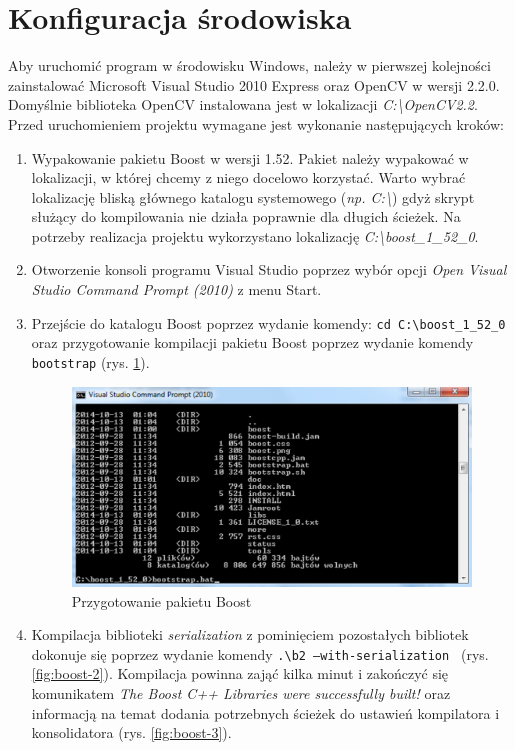 \section{Konfiguracja środowiska}
Aby uruchomić program w środowisku Windows, należy w pierwszej kolejności zainstalować Microsoft Visual Studio 2010 Express oraz OpenCV w wersji 2.2.0. Domyślnie biblioteka OpenCV instalowana jest w lokalizacji \emph{C:\textbackslash OpenCV2.2}. Przed uruchomieniem projektu wymagane jest wykonanie następujących kroków:
\begin{enumerate}
  \item Wypakowanie pakietu Boost w wersji 1.52. Pakiet należy wypakować w lokalizacji, w której chcemy z niego docelowo korzystać. Warto wybrać lokalizację bliską głównego katalogu systemowego (\emph{np. C:\textbackslash}) gdyż skrypt służący do kompilowania nie działa poprawnie dla długich ścieżek. Na potrzeby realizacja projektu wykorzystano lokalizację \emph{C:\textbackslash boost\_1\_52\_0}.
  \item Otworzenie konsoli programu Visual Studio poprzez wybór opcji \emph{Open Visual Studio Command Prompt (2010)} z menu Start.
  \item Przejście do katalogu Boost poprzez wydanie komendy: \texttt{cd C:\textbackslash boost\_1\_52\_0} oraz przygotowanie kompilacji pakietu Boost poprzez wydanie komendy \texttt{bootstrap} (rys. \ref{fig:boost-1}).
  
  \begin{figure}[h]
		\centering
		\includegraphics[scale=0.85]{graphics/03_implementacja/boost-1.pdf}
		\caption{ Przygotowanie pakietu Boost }
		\label{fig:boost-1}
	\end{figure}

  \item Kompilacja biblioteki \emph{serialization} z pominięciem pozostałych bibliotek dokonuje się poprzez wydanie komendy \texttt{.\textbackslash b2 --with-serialization } (rys. \ref{fig:boost-2}). Kompilacja powinna zająć kilka minut i zakończyć się komunikatem \emph{The Boost C++ Libraries were successfully built!} oraz informacją na temat dodania potrzebnych ścieżek do ustawień kompilatora i konsolidatora (rys. \ref{fig:boost-3}).
  

\end{enumerate}
